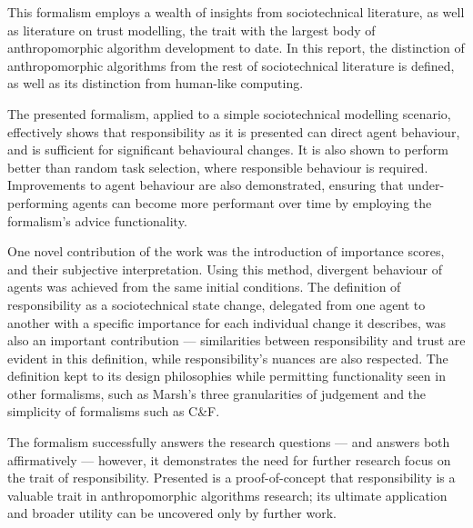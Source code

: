 This formalism employs a wealth of insights from sociotechnical literature, as well as literature on trust modelling, the trait with the largest body of anthropomorphic algorithm development to date. In this report, the distinction of anthropomorphic algorithms from the rest of sociotechnical literature is defined, as well as its distinction from  human-like computing.\par

The presented formalism, applied to a simple sociotechnical modelling scenario, effectively shows that responsibility as it is presented can direct agent behaviour, and is sufficient for significant behavioural changes. It is also shown to perform better than random task selection, where responsible behaviour is required. Improvements to agent behaviour are also demonstrated, ensuring that under-performing agents can become more performant over time by employing the formalism's advice functionality.\par

One novel contribution of the work was the introduction of importance scores, and their subjective interpretation. Using this method, divergent behaviour of agents was achieved from the same initial conditions. The definition of responsibility as a sociotechnical state change, delegated from one agent to another with a specific importance for each individual change it describes, was also an important contribution --- similarities between responsibility and trust are evident in this definition, while responsibility's nuances are also respected. The definition kept to its design philosophies while permitting functionality seen in other formalisms, such as Marsh's three granularities of judgement and the simplicity of formalisms such as C\&F.\par

The formalism successfully answers the research questions --- and answers both affirmatively --- however, it demonstrates the need for further research focus on the trait of responsibility. Presented is a proof-of-concept that responsibility is a valuable trait in anthropomorphic algorithms research; its ultimate application and broader utility can be uncovered only by further work.




